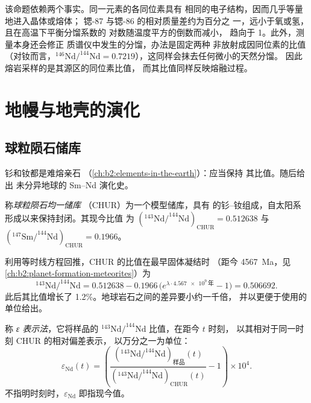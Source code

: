 \noindent 该命题依赖两个事实。同一元素的各同位素具有
相同的电子结构，因而几乎等量地进入晶体或熔体；
锶-87 与锶-86 的相对质量差约为百分之
一，远小于氧或氢，且在高温下平衡分馏系数的
对数随温度平方的倒数而减小，
趋向于 1。此外，测量本身还会修正
质谱仪中发生的分馏，办法是固定两种
非放射成因同位素的比值（对钕而言，$^{146}\mathrm{Nd}/^{144}\mathrm{Nd} =
0.7219$），这同样会抹去任何微小的天然分馏。
因此熔岩采样的是其源区的同位素比值，
而其比值同样反映熔融过程。

\section{地幔与地壳的演化}

\subsection{球粒陨石储库}

钐和钕都是难熔亲石
（\cref{ch:b2:elements-in-the-earth}）：应当保持
其比值。随后给出
未分异地球的 Sm--Nd 演化史。

\begin{definition}[球粒陨石均一储库]\label{def:b2:isotope-geochemistry:chur}
称\emph{球粒陨石均一储库}
（CHUR）为一个模型储库，具有
的钐–钕组成，自太阳系形成以来保持封闭。其现今比值
为 $(^{143}\mathrm{Nd}/^{144}\mathrm{Nd})_{\mathrm{CHUR}} = 0.512638$ 与
$(^{147}\mathrm{Sm}/^{144}\mathrm{Nd})_{\mathrm{CHUR}} = 0.1966$。
\end{definition}

利用等时线方程回推，CHUR 的比值在最早固体凝结时
（距今 \qty{4567}{Ma}，见\cref{ch:b2:planet-formation-meteorites}）为
\[
  ^{143}\mathrm{Nd}/^{144}\mathrm{Nd} = 0.512638 - 0.1966\,\bigl(e^{\lambda\cdot
  \num{4.567e9}\,\text{年}}-1\bigr) = 0.506692 .
\] 此后其比值增长了
1.2\%。地球岩石之间的差异要小约一千倍，
并以更便于使用的单位给出。

\begin{definition}[ε 表示法]\label{def:b2:isotope-geochemistry:epsilon}
称 \emph{ε 表示法}，它将样品的
$^{143}\mathrm{Nd}/^{144}\mathrm{Nd}$ 比值，在距今 $t$ 时刻，
以其相对于同一时刻 CHUR 的相对偏差表示，
以万分之一为单位：
\[
  \varepsilon_{\mathrm{Nd}}(t) = \left(
  \frac{(^{143}\mathrm{Nd}/^{144}\mathrm{Nd})_{\text{样品}}(t)}
       {(^{143}\mathrm{Nd}/^{144}\mathrm{Nd})_{\mathrm{CHUR}}(t)} - 1\right)\times 10^4 .
\]
不指明时刻时，$\varepsilon_{\mathrm{Nd}}$ 即指现今值。
\end{definition}

